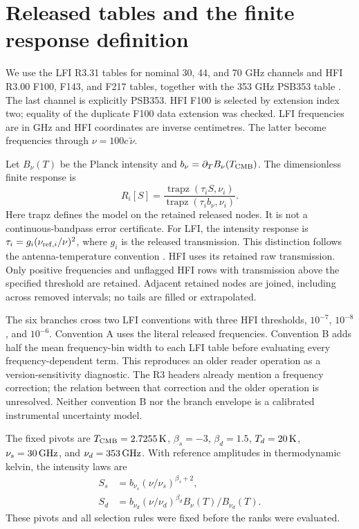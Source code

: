 \documentclass[aps,prd,preprint,nofootinbib,11pt]{revtex4-2}
\begin{document}
\section{Released tables and the finite response definition}
We use the LFI R3.31 tables for nominal 30, 44, and 70 GHz channels and HFI R3.00 F100, F143, and F217 tables, together with the 353 GHz PSB353 table \cite{rimoL,rimoH}. The last channel is explicitly PSB353. HFI F100 is selected by extension index two; equality of the duplicate F100 data extension was checked. LFI frequencies are in GHz and HFI coordinates are inverse centimetres. The latter become frequencies through $\nu=100c\,\widetilde\nu$.

Let $B_\nu(T)$ be the Planck intensity and $b_\nu=\partial_TB_\nu(T_{\rm CMB})$. The dimensionless finite response is
\begin{equation}
 R_i[S]=\frac{\operatorname{trapz}(\tau_i S,\nu_i)}
 {\operatorname{trapz}(\tau_i b_\nu,\nu_i)}.\label{eq:response}
\end{equation}
Here trapz defines the model on the retained released nodes. It is not a continuous-bandpass error certificate. For LFI, the intensity response is $\tau_i=g_i(\nu_{{\rm ref},i}/\nu)^2$, where $g_i$ is the released transmission. This distinction follows the antenna-temperature convention \cite{lfiCal,color}. HFI uses its retained raw transmission. Only positive frequencies and unflagged HFI rows with transmission above the specified threshold are retained. Adjacent retained nodes are joined, including across removed intervals; no tails are filled or extrapolated.

The six branches cross two LFI conventions with three HFI thresholds, $10^{-7}$, $10^{-8}$, and $10^{-6}$. Convention A uses the literal released frequencies. Convention B adds half the mean frequency-bin width to each LFI table before evaluating every frequency-dependent term. This reproduces an older reader operation \cite{color} as a version-sensitivity diagnostic. The R3 headers already mention a frequency correction; the relation between that correction and the older operation is unresolved. Neither convention B nor the branch envelope is a calibrated instrumental uncertainty model.

The fixed pivots are $T_{\rm CMB}=2.7255\,{\rm K}$, $\beta_s=-3$, $\beta_d=1.5$, $T_d=20\,{\rm K}$, $\nu_s=30\,{\rm GHz}$, and $\nu_d=353\,{\rm GHz}$. With reference amplitudes in thermodynamic kelvin, the intensity laws are
\begin{align}
 S_s&=b_{\nu_s}(\nu/\nu_s)^{\beta_s+2},\\
 S_d&=b_{\nu_d}(\nu/\nu_d)^{\beta_d}
             B_\nu(T)/B_{\nu_d}(T).
\end{align}
These pivots and all selection rules were fixed before the ranks were evaluated.
\clearpage
\end{document}

